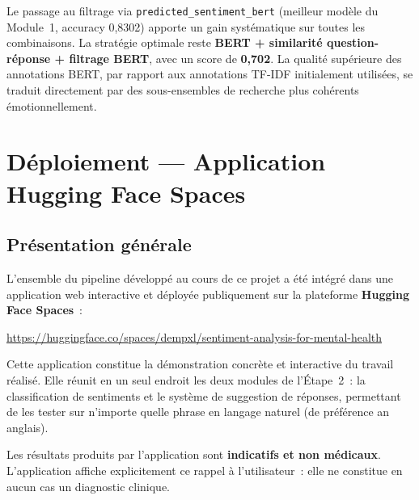 \documentclass[12pt,a4paper]{report}
\begin{document}
\begin{note}
Le passage au filtrage via \texttt{predicted\_sentiment\_bert} (meilleur modèle du Module~1, accuracy 0,8302) 
apporte un gain systématique sur toutes les combinaisons. La stratégie optimale reste 
\textbf{BERT + similarité question-réponse + filtrage BERT}, avec un score de \textbf{0,702}. 
La qualité supérieure des annotations BERT, par rapport aux annotations TF-IDF initialement utilisées, 
se traduit directement par des sous-ensembles de recherche plus cohérents émotionnellement.
\end{note}

\pagebreak

\chapter{Déploiement — Application Hugging Face Spaces}

\section{Présentation générale}

L'ensemble du pipeline développé au cours de ce projet a été intégré dans une
application web interactive et déployée publiquement sur la plateforme
\textbf{Hugging Face Spaces}~:

\begin{center}
\url{https://huggingface.co/spaces/dempxl/sentiment-analysis-for-mental-health}
\end{center}

Cette application constitue la démonstration concrète et interactive du travail réalisé.
Elle réunit en un seul endroit les deux modules de l'Étape~2~: la classification de
sentiments et le système de suggestion de réponses, permettant de les tester sur
n'importe quelle phrase en langage naturel (de préférence an anglais).

\begin{warn}
Les résultats produits par l'application sont \textbf{indicatifs et non médicaux}. 
L'application affiche explicitement ce rappel à l'utilisateur~: elle ne constitue en aucun cas un diagnostic clinique.
\end{warn}
\end{document}
